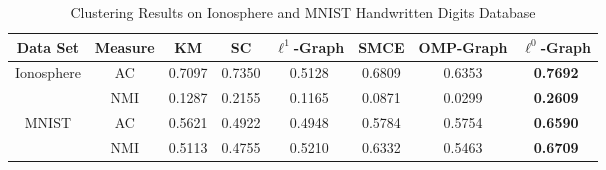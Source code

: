 \documentclass[10pt,twocolumn,letterpaper]{article}
\begin{document}
\begin{table*}[ht]
\centering
\caption{\small Clustering Results on Ionosphere and MNIST Handwritten Digits Database}
\begin{tabular}{|c|c|c|c|c|c|c|c|}
  \hline
  Data Set

                              &Measure & KM    & SC     &$\ell^{1}$-Graph   &SMCE    &OMP-Graph   &$\ell^{0}$-Graph   \\\hline

  \multirow{2}{*}{Ionosphere} &AC      &0.7097 &0.7350  &0.5128             &0.6809  &0.6353      &\textbf{0.7692} \\ \cline{2-8}
                              &NMI     &0.1287 &0.2155  &0.1165             &0.0871  &0.0299      &\textbf{0.2609} \\ \hline

  \multirow{2}{*}{MNIST}      &AC      &0.5621 &0.4922  &0.4948             &0.5784  &0.5754      &\textbf{0.6590} \\ \cline{2-8}
                              &NMI     &0.5113 &0.4755  &0.5210             &0.6332  &0.5463      &\textbf{0.6709} \\ \hline

\end{tabular}
\label{table:uci-mnist}
\end{table*}
\end{document}
